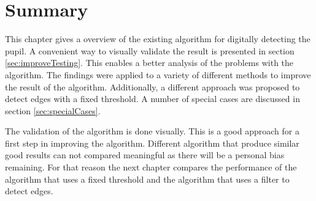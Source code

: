 \section{Summary}
This chapter gives a overview of the existing algorithm for digitally detecting the pupil. A convenient way to visually validate the result is presented in section \ref{sec:improveTesting}. This enables a better analysis of the problems with the algorithm. The findings were applied to a variety of different methods to improve the result of the algorithm. Additionally, a different approach was proposed to detect edges with a fixed threshold. A number of special cases are discussed in section \ref{sec:specialCases}.

The validation of the algorithm is done visually. This is a good approach for a first step in improving the algorithm. Different algorithm that produce similar good results can not compared meaningful as there will be a personal bias remaining. For that reason the next chapter compares the performance of the algorithm that uses a fixed threshold and the algorithm that uses a filter to detect edges.



